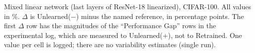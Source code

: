 \begin{table}[t]
  \centering
  
  \caption{Mixed linear network (last layers of ResNet-18 linearized), CIFAR-100. All values in \%. $\Delta$ is Unlearned($-$) minus the named reference, in percentage points. The first $\Delta$ row has the magnitudes of the ``Performance Gap'' rows in the experimental log, which are measured to Unlearned($+$), not to Retrained. One value per cell is logged; there are no variability estimates (single run).}
  \label{tab:mixed}
\end{table}
